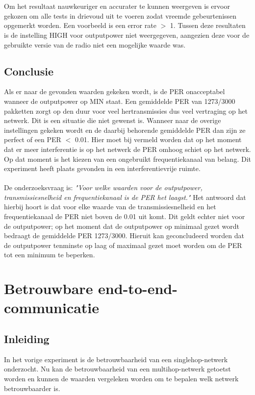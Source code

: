\documentclass{article}
\begin{document}
\\
\\
Om het resultaat nauwkeuriger en accurater te kunnen weergeven is ervoor gekozen om alle tests in drievoud uit te voeren zodat vreemde gebeurtenissen opgemerkt worden. Een voorbeeld is een error rate $>$ 1. Tussen deze resultaten is de instelling HIGH voor outputpower niet weergegeven, aangezien deze voor de gebruikte versie van de radio niet een mogelijke waarde was.

\subsection{Conclusie}
Als er naar de gevonden waarden gekeken wordt, is de PER onacceptabel wanneer de outputpower op MIN staat. Een gemiddelde PER van 1273/3000 pakketten zorgt op den duur voor veel hertransmissies dus veel vertraging op het netwerk. Dit is een situatie die niet gewenst is. Wanneer naar de overige instellingen gekeken wordt en de daarbij behorende gemiddelde PER dan zijn ze perfect of een PER $<$ 0.01. Hier moet bij vermeld worden dat op het moment dat er meer interferentie is op het netwerk de PER omhoog schiet op het netwerk. Op dat moment is het kiezen van een ongebruikt frequentiekanaal van belang. Dit experiment heeft plaats gevonden in een interferentievrije ruimte.\\
\\
De onderzoeksvraag is: \textit{"Voor welke waarden voor de outputpower, transmissiesnelheid en frequentiekanaal is de PER het laagst."} Het antwoord dat hierbij hoort is dat voor elke waarde van de transmissiesnelheid en het frequentiekanaal de PER niet boven de 0.01 uit komt. Dit geldt echter niet voor de outputpower; op het moment dat de outputpower op minimaal gezet wordt bedraagt de gemiddelde PER 1273/3000. Hieruit kan geconcludeerd worden dat de outputpower tenminste op laag of maximaal gezet moet worden om de PER tot een minimum te beperken. 

\newpage

\clearpage
\section{Betrouwbare end-to-end-communicatie}

\subsection{Inleiding}
In het vorige experiment is de betrouwbaarheid van een singlehop-netwerk onderzocht. Nu kan de betrouwbaarheid van een multihop-netwerk getoetst worden en kunnen de waarden vergeleken worden om te bepalen welk netwerk betrouwbaarder is. 
\end{document}

